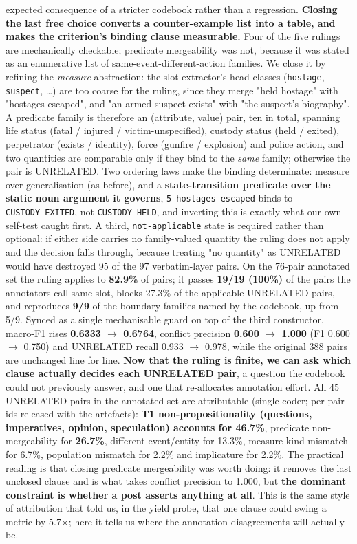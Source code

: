 expected consequence of a stricter codebook rather than a regression.
\textbf{Closing the last free choice converts a counter-example list into a table, and makes the criterion's binding clause measurable.} Four of the five rulings are mechanically checkable; predicate mergeability was not, because it was stated as an enumerative list of same-event-different-action families. We close it by refining the \emph{measure} abstraction: the slot extractor's head classes (\texttt{hostage}, \texttt{suspect}, \ldots{}) are too coarse for the ruling, since they merge "held hostage" with "hostages escaped", and "an armed suspect exists" with "the suspect's biography". A predicate family is therefore an (attribute, value) pair, ten in total, spanning life status (fatal / injured / victim-unspecified), custody status (held / exited), perpetrator (exists / identity), force (gunfire / explosion) and police action, and two quantities are comparable only if they bind to the \emph{same} family; otherwise the pair is UNRELATED. Two ordering laws make the binding determinate: measure over generalisation (as before), and a \textbf{state-transition predicate over the static noun argument it governs}, \texttt{5 hostages escaped} binds to \texttt{CUSTODY\_EXITED}, not \texttt{CUSTODY\_HELD}, and inverting this is exactly what our own self-test caught first. A third, \texttt{not-applicable} state is required rather than optional: if either side carries no family-valued quantity the ruling does not apply and the decision falls through, because treating "no quantity" as UNRELATED would have destroyed 95 of the 97 verbatim-layer pairs. On the 76-pair annotated set the ruling applies to \textbf{82.9\%} of pairs; it passes \textbf{19/19 (100\%)} of the pairs the annotators call same-slot, blocks 27.3\% of the applicable UNRELATED pairs, and reproduces \textbf{9/9} of the boundary families named by the codebook, up from 5/9. Synced as a single mechanisable guard on top of the third constructor, macro-F1 rises \textbf{0.6333 $\to$ 0.6764}, conflict precision \textbf{0.600 $\to$ 1.000} (F1 0.600 $\to$ 0.750) and UNRELATED recall 0.933 $\to$ 0.978, while the original 388 pairs are unchanged line for line.
\textbf{Now that the ruling is finite, we can ask which clause actually decides each UNRELATED pair}, a question the codebook could not previously answer, and one that re-allocates annotation effort. All 45 UNRELATED pairs in the annotated set are attributable (single-coder; per-pair ids released with the artefacts): \textbf{T1 non-propositionality (questions, imperatives, opinion, speculation) accounts for 46.7\%}, predicate non-mergeability for \textbf{26.7\%}, different-event/entity for 13.3\%, measure-kind mismatch for 6.7\%, population mismatch for 2.2\% and implicature for 2.2\%. The practical reading is that closing predicate mergeability was worth doing: it removes the last unclosed clause and is what takes conflict precision to 1.000, but \textbf{the dominant constraint is whether a post asserts anything at all}. This is the same style of attribution that told us, in the yield probe, that one clause could swing a metric by 5.7$\times$; here it tells us where the annotation disagreements will actually be.
